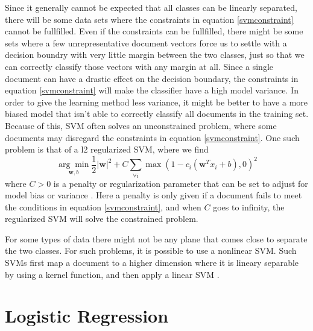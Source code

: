 Since it generally cannot be expected that all classes can be linearly separated, there will be some data sets where the constraints in equation \ref{svmconstraint} cannot be fullfilled. Even if the constraints can be fullfilled, there might be some sets where a few unrepresentative document vectors force us to settle with a decision boundry with very little margin between the two classes, just so that we can correctly classify those vectors with any margin at all. Since a single document can have a drastic effect on the decision boundary, the constraints in equation \ref{svmconstraint} will make the classifier have a high model variance. In order to give the learning method less variance, it might be better to have a more biased model that isn't able to correctly classify all documents in the training set. Because of this, SVM often solves an unconstrained problem, where some documents may disregard the constraints in equation \ref{svmconstraint}. One such problem is that of a l2 regularized SVM, where we find
\begin{equation}
\label{svmregularized}
\underset{\mathbf{w}, b}{\arg \min} \frac{1}{2}|\mathbf{w}|^2+C\sum_{\forall i} \max(1-c_i(\mathbf{w}^Tx_i+b), 0)^2
\end{equation}
where $C > 0$ is a penalty or regularization parameter that can be set to adjust for model bias or variance \cite{liblinear}. Here a penalty is only given if a document fails to meet the conditions in equation \ref{svmconstraint}, and when $C$ goes to infinity, the regularized SVM will solve the constrained problem.

For some types of data there might not be any plane that comes close to separate the two classes. For such problems, it is possible to use a nonlinear SVM. Such SVMs first map a document to a higher dimension where it is lineary separable by using a kernel function, and then apply a linear SVM \cite[p. 331]{information}. 

\section{Logistic Regression}
\label{sect:logisticregression}

